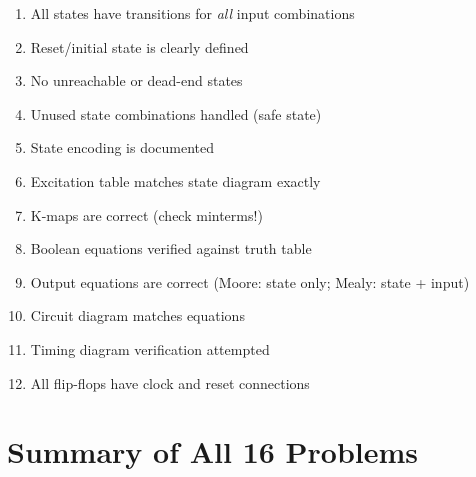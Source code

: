 \documentclass[12pt,a4paper]{article}
\begin{document}
\begin{tipbox}
\begin{enumerate}[leftmargin=*]
  \item[$\square$] All states have transitions for \emph{all} input combinations
  \item[$\square$] Reset/initial state is clearly defined
  \item[$\square$] No unreachable or dead-end states
  \item[$\square$] Unused state combinations handled (safe state)
  \item[$\square$] State encoding is documented
  \item[$\square$] Excitation table matches state diagram exactly
  \item[$\square$] K-maps are correct (check minterms!)
  \item[$\square$] Boolean equations verified against truth table
  \item[$\square$] Output equations are correct (Moore: state only; Mealy: state + input)
  \item[$\square$] Circuit diagram matches equations
  \item[$\square$] Timing diagram verification attempted
  \item[$\square$] All flip-flops have clock and reset connections
\end{enumerate}
\end{tipbox}


\section{Summary of All 16 Problems}
\end{document}
